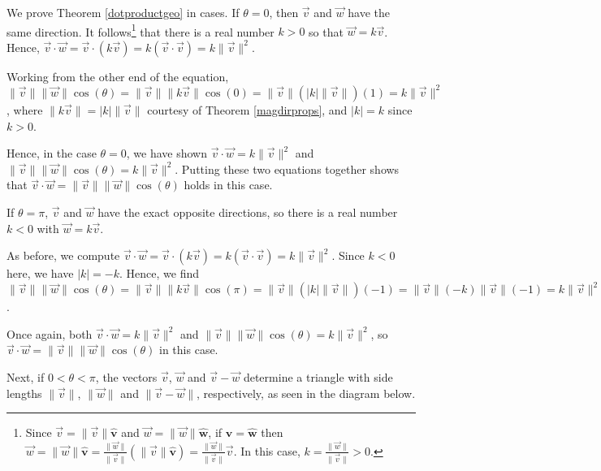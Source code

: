 \documentclass{ximera}
\begin{document}
\smallskip

We prove Theorem \ref{dotproductgeo} in cases. If $\theta = 0$, then $\vec{v}$ and $\vec{w}$ have the same direction. It follows\footnote{Since $\vec{v} = \| \vec{v} \| \bm\hat{v}$ and $\vec{w} = \| \vec{w} \| \bm\hat{w}$, if $\bm\hat{v} = \bm\hat{w}$ then $\vec{w} = \|\vec{w}\| \bm\hat{v} = \frac{\| \vec{w} \|}{\| \vec{v} \|} (\| \vec{v} \| \bm\hat{v}) =  \frac{\| \vec{w} \|}{\| \vec{v} \|}  \vec{v}$.  In this case, $k = \frac{\| \vec{w} \|}{\| \vec{v} \|} > 0$.} that there is a real number $k > 0$ so that $\vec{w} = k \vec{v}$.  Hence, $\vec{v} \cdot \vec{w} = \vec{v} \cdot (k \vec{v}) = k (\vec{v} \cdot \vec{v}) =  k \| \vec{v} \|^2$.  

\smallskip

Working from the other end of the equation, $\| \vec{v} \| \| \vec{w} \| \cos(\theta) = \| \vec{v} \| \|k \vec{v} \| \cos(0) =  \| \vec{v} \| (|k| \| \vec{v} \|) (1) = k \| \vec{v} \|^2$, where $\|k \vec{v} \| = |k| \| \vec{v} \|$ courtesy of Theorem \ref{magdirprops}, and $|k| = k$ since $k > 0$.


\smallskip

Hence, in the case $\theta = 0$, we have shown $\vec{v} \cdot \vec{w} = k \| \vec{v} \|^2$  and $\| \vec{v} \| \| \vec{w} \| \cos(\theta)= k \| \vec{v} \|^2$.  Putting these two equations together shows that $\vec{v} \cdot \vec{w} = \|\vec{v}\| \|\vec{w}\| \cos(\theta)$ holds in this case.

\smallskip


 If $\theta = \pi$,  $\vec{v}$ and $\vec{w}$ have the exact opposite directions, so there is a real number $k< 0$ with $\vec{w} = k \vec{v}$.
 
 \smallskip
 
  As before, we compute $\vec{v} \cdot \vec{w} = \vec{v} \cdot (k \vec{v}) = k (\vec{v} \cdot \vec{v}) =  k \| \vec{v} \|^2$.    Since $k< 0$ here, we have $|k| = -k$.  Hence, we find  $\| \vec{v} \| \| \vec{w} \| \cos(\theta)   = \| \vec{v} \| \| k \vec{v}  \| \cos(\pi) =  \| \vec{v} \| (|k| \| \vec{v} \|) (-1) = \| \vec{v} \| (-k) \| \vec{v} \| (-1) = k \| \vec{v} \|^2$.
 
 \smallskip
 
Once again, both $\vec{v} \cdot \vec{w} = k \| \vec{v} \|^2$  and $\| \vec{v} \| \| \vec{w} \| \cos(\theta)= k \| \vec{v} \|^2$, so $\vec{v} \cdot \vec{w} = \|\vec{v}\| \|\vec{w}\| \cos(\theta)$ in this case.
 
 \smallskip
 
 Next, if $0 < \theta < \pi$, the  vectors $\vec{v}$, $\vec{w}$ and $\vec{v} - \vec{w}$ determine a triangle with side lengths $\| \vec{v} \|$, $\| \vec{w} \|$ and $\| \vec{v} - \vec{w} \|$, respectively, as seen in the diagram below.
\end{document}

